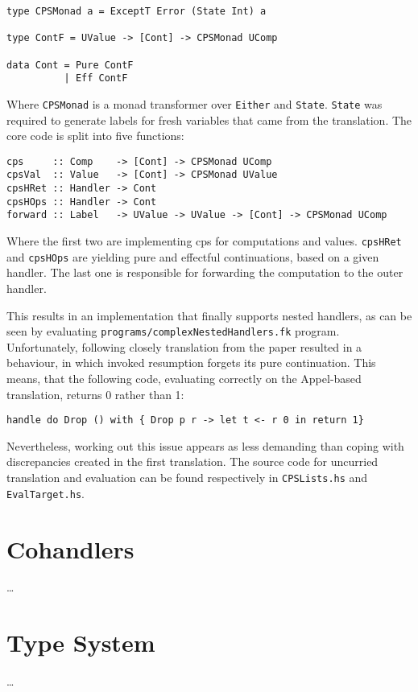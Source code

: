 \documentclass[declaration,shortabstract]{iithesis}
\begin{document}
    \begin{verbatim}
type CPSMonad a = ExceptT Error (State Int) a

type ContF = UValue -> [Cont] -> CPSMonad UComp

data Cont = Pure ContF
          | Eff ContF
    \end{verbatim}
    Where \verb!CPSMonad! is a monad transformer over \verb!Either! and \verb!State!.
    \verb!State! was required to generate labels for fresh variables that
    came from the translation. The core code is split into five functions:

    \begin{verbatim}
cps     :: Comp    -> [Cont] -> CPSMonad UComp
cpsVal  :: Value   -> [Cont] -> CPSMonad UValue
cpsHRet :: Handler -> Cont
cpsHOps :: Handler -> Cont
forward :: Label   -> UValue -> UValue -> [Cont] -> CPSMonad UComp
    \end{verbatim}
    Where the first two are implementing cps for computations and values.
    \verb!cpsHRet! and \verb!cpsHOps! are yielding pure and effectful continuations,
    based on a given handler. The last one is responsible for forwarding the
    computation to the outer handler.

    This results in an implementation that finally supports nested handlers,
    as can be seen by evaluating \verb!programs/complexNestedHandlers.fk! program.
    Unfortunately, following closely translation from the paper resulted in
    a behaviour, in which invoked resumption forgets its pure continuation. This means,
    that the following code, evaluating correctly on the Appel-based translation,
    returns 0 rather than 1:

    \begin{verbatim}
handle do Drop () with { Drop p r -> let t <- r 0 in return 1}
    \end{verbatim}
    Nevertheless, working out this issue appears as less demanding than coping with
    discrepancies created in the first translation. The source code for uncurried
    translation and evaluation can be found respectively in \verb!CPSLists.hs! and
    \verb!EvalTarget.hs!.

    \section{Cohandlers}
    \ldots

    \section{Type System}
    \ldots
\end{document}
